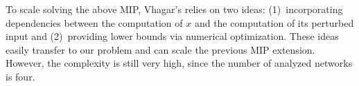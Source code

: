 To scale solving the above MIP, Vhagar's relies on two ideas: (1)~incorporating dependencies between the computation of $x$ and the computation of its perturbed input and (2)~providing lower bounds via numerical optimization.
These ideas easily transfer to our problem and can scale the previous MIP extension. 
However, the complexity is still very high, since the number of analyzed networks is four.  
